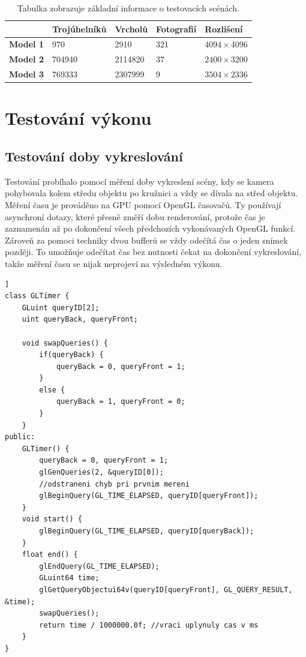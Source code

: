 \documentclass[11pt,twoside,a4paper]{book}
\begin{document}
\begin{table}[h]
\begin{center}
%
\begin{tabularx}{\textwidth}{|l|R|R|R|R|}
\hline
 & \textbf{Trojúhelníků} &\textbf{Vrcholů} & \textbf{Fotografií} & \textbf{Rozlišení} \\ \hline
\textbf{Model 1} & 970 & 2910 & 321 & $4094\times4096$ \\ \hline
\textbf{Model 2} & 704940 & 2114820 & 37 & $2400\times3200$ \\ \hline
\textbf{Model 3} & 769333 & 2307999 & 9 & $3504\times2336$ \\ \hline
\end{tabularx}
\caption{Tabulka zobrazuje základní informace o testovacích scénách.}
\label{tab:test-1}

\end{center}
\end{table}

\newpage %
\section{Testování výkonu}

\subsection{Testování doby vykreslování}

Testování probíhalo pomocí měření doby vykreslení scény, kdy se kamera pohybovala kolem středu objektu po kružnici a vždy se dívala na střed objektu. Měření času je prováděno na GPU pomocí OpenGL časovačů. Ty používají asynchroní dotazy, které přesně změří dobu renderování, protože čas je zaznamenán až po dokončení všech předchozích vykonávaných OpenGL funkcí. Zároveň za pomoci techniky dvou bufferů se vždy odečítá čas o jeden snímek později. To umožňuje odečítat čas bez nutnosti čekat na dokončení vykreslování, takže měření času se nijak neprojeví na výsledném výkonu.

\begin{lstlisting}[caption={Asynchroní měření času na GPU.},firstnumber=1,label={code:time},float=[ht]]
class GLTimer {
	GLuint queryID[2];
	uint queryBack, queryFront;
		
	void swapQueries() {
		if(queryBack) {
			queryBack = 0, queryFront = 1;
		}
		else {
			queryBack = 1, queryFront = 0;
		}
	}
public:
	GLTimer() {
		queryBack = 0, queryFront = 1;
		glGenQueries(2, &queryID[0]);
		//odstraneni chyb pri prvnim mereni
		glBeginQuery(GL_TIME_ELAPSED, queryID[queryFront]); 
	}
	void start() {
		glBeginQuery(GL_TIME_ELAPSED, queryID[queryBack]);
	}
	float end() {
		glEndQuery(GL_TIME_ELAPSED);
		GLuint64 time;
		glGetQueryObjectui64v(queryID[queryFront], GL_QUERY_RESULT, &time);
		swapQueries();
		return time / 1000000.0f; //vraci uplynuly cas v ms
	}
}
\end{lstlisting}
\end{document}
